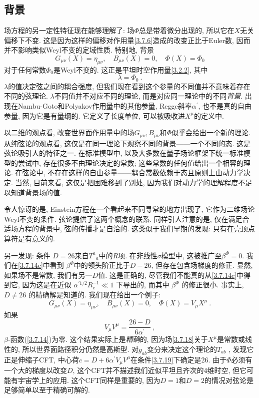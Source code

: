 \subsection*{背景}
场方程的另一定性特征现在能够理解了: 场$\Phi$总是带着微分出现的, 所以它在$X$无关偏移下不变. 这是因为这样的偏移对作用量\eqref{3.7.6}造成的改变正比于Euler数, 
因而并不影响类似Weyl不变的定域性质. 特别地, 背景
\begin{equation}
G_{\mu \nu}(X)=\eta_{\mu \nu}, \quad B_{\mu \nu}(X)=0, \quad \Phi(X)=\Phi_{0}
\end{equation}
对于任何常数$\Phi_0$是Weyl不变的. 这正是平坦时空作用量\eqref{3.2.2}, 其中
\begin{equation}
\lambda=\Phi_{0} \:. \label{3.7.17}
\end{equation}
$\lambda$的值决定弦之间的耦合强度, 但我们现在看到这个参量的不同值并不意味着存在不同的弦理论.  $\lambda$不同值并不对应不同的理论, 而是对应同一理论中的不同\emph{背景}. 
出现在Nambu-Goto和Polyakov作用量中的其他参量, Regge斜率$\alpha^{\prime}$, 也不是真的自由参量, 因为它是有量纲的. 它定义了长度单位, 可以被吸收进$X^{\mu}$的定义中. 

以二维的观点看, 改变世界面作用量中的场$G_{\mu \nu}, B_{\mu \nu}$和$\Phi$似乎会给出一个新的理论. 从纯弦论的观点看, 这仅是在同一理论下观察不同的背景——一个不同的态. 
这是弦论吸引人的特征之一. 在标准模型中, 以及大多数在量子场论框架下统一标准模型的尝试中, 存在很多不由理论决定的常数; 这些常数的任何值给出一个相容的理论. 在弦论中, 不存在这样的自由参量——耦合常数依赖于态且原则上由动力学决定. 当然, 目前来看, 这仅是把困难移到了别处, 因为我们对动力学的理解程度不足以知道背景场的值.

令人惊讶的是, Einstein方程在一个看起来不同寻常的地方出现了, 它作为二维场论Weyl不变的条件. 弦论提供了这两个概念的联系. 同样引人注意的是, 仅在满足合适场方程的背景中, 弦的传播才是自洽的. 这类似于我们早期的发现: 只有在壳顶点算符是有意义的.

另一发现: 条件 $D=26$来自$T^{a}{}_{a}$中的$R$项. 在非线性$\sigma$模型中, 这被推广至$\beta^{\Phi}=0$. 
我们在\eqref{3.7.14c}中看到 $\beta^{\Phi}$中的领头阶正比于$D-26$, 但存在包含场梯度的修正. 显然, 如果场不是常数, 我们有另一$D$值. 这是正确的, 
尽管我们不能真的从\eqref{3.7.14c}中得到它, 因为这是在近似 $\alpha^{\prime 1 / 2} R_{\mathrm{c}}^{-1} \ll 1$ 下导出的, 而其中 $\beta^{\Phi}$ 的修正很小. 事实上,  $D \neq 26$ 的精确解是知道的. 我们现在给出一个例子: 
\begin{equation}\label{3.7.18}
G_{\mu \nu}(X)=\eta_{\mu \nu}, \quad B_{\mu \nu}(X)=0, \quad \Phi(X)=V_{\mu} X^{\mu} \:.
\end{equation}
如果
\begin{equation}
V_{\mu} V^{\mu}=\frac{26-D}{6 \alpha^{\prime}} \:, \label{3.7.19}
\end{equation}
$\beta$-函数(\ref{3.7.14})为零. 这个结果实际上是\emph{精确}的, 因为场\eqref{3.7.18}关于$X^\mu$是常数或线性的, 所以世界面路径积分仍然是高斯型. 
对$g_{a b}$变分来决定这个理论的$T_{a b}$ , 发现它正是伸缩子CFT, 中心荷$c=D+6 \alpha^{\prime} V_{\mu} V^{\mu}$在条件\eqref{3.7.19}下确定是26. 
由于$\Phi$必须有一个大的梯度以改变$D$, 这个CFT并不描述我们近似平坦且齐次的4维时空, 但它可能有宇宙学上的应用. 这个CFT同样是重要的, 
因为$D=1$和$D=2$的情况对弦论是足够简单以至于精确可解的.

